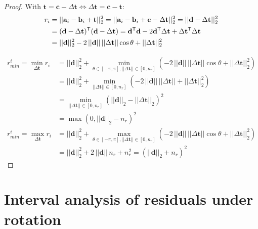 \begin{proof}
	With $\mathbf{t}= \mathbf{c} - \Delta \mathbf{t} \iff \Delta \mathbf{t} = \mathbf{c} - \mathbf{t}$:
	\begin{equation}
		\begin{aligned}
			r_i &= ||\mathbf{a}_i - \mathbf{b}_i + \mathbf{t}||_2^2
			= ||\mathbf{a}_i - \mathbf{b}_i + \mathbf{c} - \Delta\mathbf{t}||_2^2
			= ||\mathbf{d} - \Delta\mathbf{t}||_2^2\\ 
			&= (\mathbf{d} - \Delta\mathbf{t})^{\mathsf{T}}(\mathbf{d} - \Delta\mathbf{t})=
			\mathbf{d}^{\mathsf{T}}\mathbf{d} - 2 \mathbf{d}^{\mathsf{T}} \Delta\mathbf{t} + \Delta\mathbf{t}^{\mathsf{T}} \Delta\mathbf{t}\\
			&= ||\mathbf{d}||_2^2 - 2 \, ||\mathbf{d}|| \, ||\Delta\mathbf{t}||  \cos \theta + ||\Delta\mathbf{t}||_2^2\\
		\end{aligned}
	\end{equation}
	
	\begin{equation}
		\begin{aligned}
			r_{min}^i = \min_{\Delta \mathbf{t}} r_i &= 
			||\mathbf{d}||_2^2 + 
			\min_{\theta \in [-\pi, \pi], ||\Delta\mathbf{t}|| \in [0, n_r]} \left( -2 \, ||\mathbf{d}||  \, ||\Delta\mathbf{t}|| \cos \theta + ||\Delta\mathbf{t}||_2^2 \right) \\
			&= ||\mathbf{d}||_2^2 + \min_{||\Delta\mathbf{t}|| \in [0, n_r]} \left( -2 \, ||\mathbf{d}||  \, ||\Delta\mathbf{t}|| + ||\Delta\mathbf{t}||_2^2 \right) \\
			&= \min_{||\Delta\mathbf{t}|| \in [0, n_r]}  (||\mathbf{d}||_2 - ||\Delta\mathbf{t}||_2)^2\\
			&=\max(0, ||\mathbf{d}||_2 - n_r)^2\\
			r_{min}^i = \max_{\Delta \mathbf{t}} r_i &= 
			||\mathbf{d}||_2^2 + 
			\max_{\theta \in [-\pi, \pi], ||\Delta\mathbf{t}|| \in [0, n_r]} \left( -2 \, ||\mathbf{d}||  \, ||\Delta\mathbf{t}|| \cos \theta + ||\Delta\mathbf{t}||_2^2 \right) \\
			&= ||\mathbf{d}||_2^2 + 2 \, ||\mathbf{d}||\, n_r + n_r^2 = (||\mathbf{d}||_2 + n_r)^2
		\end{aligned}
	\end{equation}
	
\end{proof}

\section{Interval analysis of residuals under rotation}
\label{proof:wls-interval-analysis-rotation}


